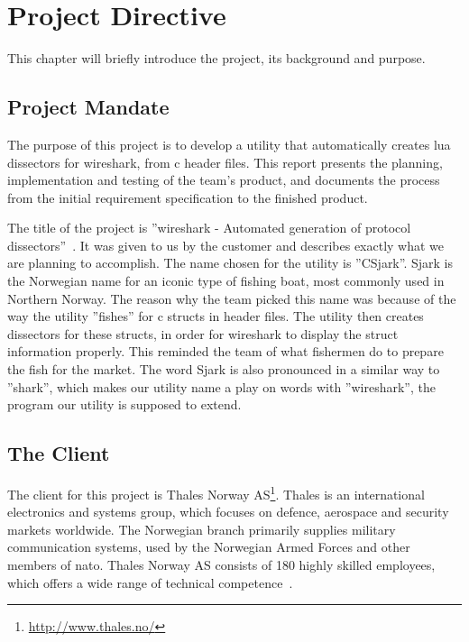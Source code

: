 \chapter{Project Directive}
This chapter will briefly introduce the project, its background and purpose.


\section{Project Mandate}
The purpose of this project is to develop a \gls{utility} that automatically creates \Gls{lua} \glspl{dissector} for \Gls{wireshark}, from \Gls{c} \gls{header} files. This report presents the planning, implementation
 and testing of the team’s product, and documents the process from the initial requirement specification to the finished product. 

The title of the project is ''\Gls{wireshark} - Automated generation of \gls{protocol} \glspl{dissector}''~\cite{Compendium}.
It was given to us by the customer and describes exactly what we are planning to accomplish. The name chosen for the \gls{utility} is ''CSjark''. Sjark is the Norwegian name for an iconic type of fishing boat, most commonly used in Northern Norway. The reason why the team picked this name was because of the way the \gls{utility} ''fishes'' for \Gls{c} \glspl{struct} in \gls{header} files. The \gls{utility} then creates \glspl{dissector} for these \glspl{struct}, in order for \Gls{wireshark} to display the \gls{struct} information properly. This reminded the team of what fishermen do to prepare the fish for the market. The word Sjark is also pronounced in a similar way to ''shark'', which makes our \gls{utility} name a play on words with ''\Gls{wireshark}'', the program our \gls{utility} is supposed to extend.


\section{The Client}
The client for this project is
Thales Norway AS\footnote{\url{http://www.thales.no/}}. Thales is an
international electronics and systems group, which focuses on defence,
aerospace and security markets worldwide. The Norwegian branch primarily
supplies military communication systems, used by the Norwegian Armed Forces
and other members of \Gls{nato}. Thales Norway AS consists of 180 highly skilled
employees, which offers a wide range of technical competence~\cite{ThalesNO}.
	
